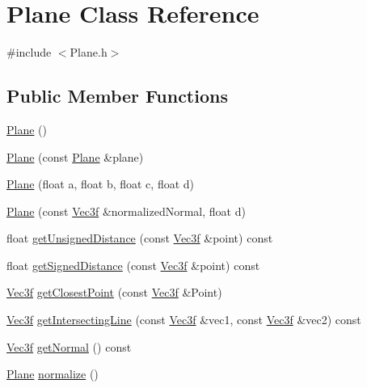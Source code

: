 \hypertarget{class_plane}{\section{Plane Class Reference}
\label{class_plane}
}


{\ttfamily \#include $<$Plane.\+h$>$}

\subsection*{Public Member Functions}
\begin{DoxyCompactItemize}
\item 
\hyperlink{class_plane_acac0d9c003e0ab10d07b146c3566a0c7}{Plane} ()
\item 
\hyperlink{class_plane_a39db0b1cb9fe03a791426b6c2e0f8f31}{Plane} (const \hyperlink{class_plane}{Plane} \&plane)
\item 
\hyperlink{class_plane_a9a1420228e8baa632c7e8ba66f27772f}{Plane} (float a, float b, float c, float d)
\item 
\hyperlink{class_plane_a08ae6ac6d070c695458f4322e9565fc0}{Plane} (const \hyperlink{class_vec3f}{Vec3f} \&normalized\+Normal, float d)
\item 
float \hyperlink{class_plane_a7ee99f03ecafc04a9a0f1bd20388eae0}{get\+Unsigned\+Distance} (const \hyperlink{class_vec3f}{Vec3f} \&point) const 
\item 
float \hyperlink{class_plane_a09af6617261774d144becb6a783e3ace}{get\+Signed\+Distance} (const \hyperlink{class_vec3f}{Vec3f} \&point) const 
\item 
\hyperlink{class_vec3f}{Vec3f} \hyperlink{class_plane_aeebad7347cc6e51cc6f98a22070c45c9}{get\+Closest\+Point} (const \hyperlink{class_vec3f}{Vec3f} \&Point)
\item 
\hyperlink{class_vec3f}{Vec3f} \hyperlink{class_plane_a1a6667a975990d138177b28578ddaee5}{get\+Intersecting\+Line} (const \hyperlink{class_vec3f}{Vec3f} \&vec1, const \hyperlink{class_vec3f}{Vec3f} \&vec2) const 
\item 
\hyperlink{class_vec3f}{Vec3f} \hyperlink{class_plane_ab14973049815c46e1d795498dc8a8ece}{get\+Normal} () const 
\item 
\hyperlink{class_plane}{Plane} \hyperlink{class_plane_a30bc1a6f61d5b50fc156c920d96d4e8c}{normalize} ()
\end{DoxyCompactItemize}
